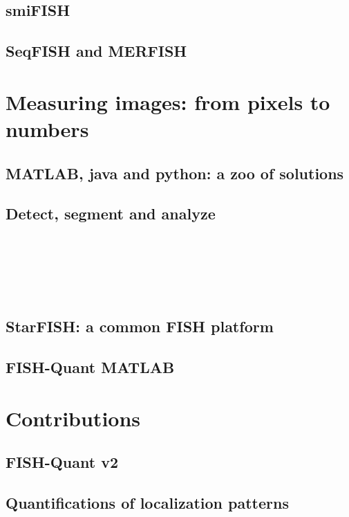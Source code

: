 \subsection{\ac{smiFISH}}

\subsection{\ac{SeqFISH} and \ac{MERFISH}}


\section{Measuring images: from pixels to numbers}


\subsection{MATLAB, java and python: a zoo of solutions}

\subsection{Detect, segment and analyze}

~\cite{shariff_automated_2010}
~\cite{laux_interactive_2020}
~\cite{das_intracellular_2021}

~\cite{mcquin_cellprofiler_2018}
~\cite{mueller_fish-quant_2013}
~\cite{de_chaumont_icy_2012}
~\cite{ershov_bringing_2021} %
~\cite{ljosa_introduction_2009}
~\cite{stoeger_computer_2015}
~\cite{perkel_starfish_2019}
~\cite{noauthor_mammalian_2020}
~\cite{eng_transcriptome-scale_2019}
~\cite{kamenova_co-translational_2019}
~\cite{liao_rna_2019}
~\cite{xia_spatial_2019}
~\cite{tsanov_smifish_2016}
~\cite{samacoits_computational_2018}
~\cite{battich_image-based_2013}
~\cite{savulescu_interrogating_2021}
~\cite{battich_control_2015}

~\cite{khater_caveolae_2019}

\subsection{StarFISH: a common \ac{FISH} platform}

\subsection{FISH-Quant MATLAB}


\section{Contributions}


\subsection{FISH-Quant v2}

\subsection{Quantifications of localization patterns}

